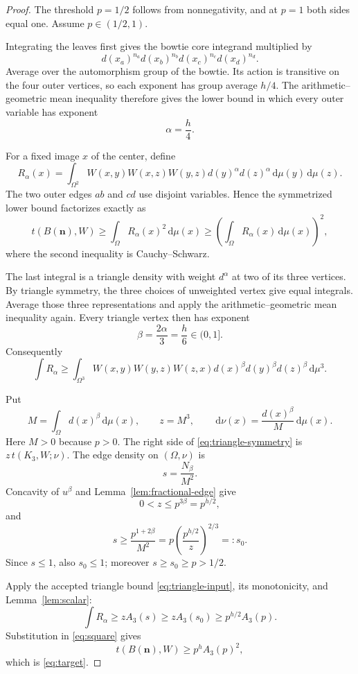 \documentclass[11pt]{article}
\newcommand{\dd}{\,\mathrm d}
\begin{document}
\begin{proof}
The threshold $p=1/2$ follows from nonnegativity, and at $p=1$ both sides
equal one.  Assume $p\in(1/2,1)$.

Integrating the leaves first gives the bowtie core integrand multiplied by
\[
 d(x_a)^{n_a}d(x_b)^{n_b}d(x_c)^{n_c}d(x_d)^{n_d}.
\]
Average over the automorphism group of the bowtie.  Its action is transitive
on the four outer vertices, so each exponent has group average $h/4$.
The arithmetic--geometric mean inequality therefore gives the lower bound
in which every outer variable has exponent
\[
 \alpha=\frac h4.
\]

For a fixed image $x$ of the center, define
\[
 R_\alpha(x)
 =\int_{\Omega^2}
 W(x,y)W(x,z)W(y,z)d(y)^\alpha d(z)^\alpha
 \dd\mu(y)\dd\mu(z).
\]
The two outer edges $ab$ and $cd$ use disjoint variables.  Hence the
symmetrized lower bound factorizes exactly as
\begin{equation}
 t(B(\boldsymbol n),W)
 \geq\int_\Omega R_\alpha(x)^2\dd\mu(x)
 \geq\left(\int_\Omega R_\alpha(x)\dd\mu(x)\right)^2,
 \label{eq:square}
\end{equation}
where the second inequality is Cauchy--Schwarz.

The last integral is a triangle density with weight $d^\alpha$ at two of
its three vertices.  By triangle symmetry, the three choices of unweighted
vertex give equal integrals.  Average those three representations and apply
the arithmetic--geometric mean inequality again.  Every triangle vertex then
has exponent
\[
 \beta=\frac{2\alpha}{3}=\frac h6\in(0,1].
\]
Consequently
\begin{equation}
 \int R_\alpha
 \geq\int_{\Omega^3}
 W(x,y)W(y,z)W(z,x)
 d(x)^\beta d(y)^\beta d(z)^\beta\dd\mu^3.
 \label{eq:triangle-symmetry}
\end{equation}

Put
\[
 M=\int_\Omega d(x)^\beta\dd\mu(x),
 \qquad z=M^3,
 \qquad
 \dd\nu(x)=\frac{d(x)^\beta}{M}\dd\mu(x).
\]
Here $M>0$ because $p>0$.  The right side of
\eqref{eq:triangle-symmetry} is $z\,t(K_3,W;\nu)$.  The edge density on
$(\Omega,\nu)$ is
\[
 s=\frac{N_\beta}{M^2}.
\]
Concavity of $u^\beta$ and Lemma~\ref{lem:fractional-edge} give
\[
 0<z\leq p^{3\beta}=p^{h/2},
\]
and
\[
 s\geq\frac{p^{1+2\beta}}{M^2}
 =p\left(\frac{p^{h/2}}z\right)^{2/3}
 =:s_0.
\]
Since $s\leq1$, also $s_0\leq1$; moreover $s\geq s_0\geq p>1/2$.

Apply the accepted triangle bound \eqref{eq:triangle-input}, its
monotonicity, and Lemma~\ref{lem:scalar}:
\[
 \int R_\alpha
 \geq zA_3(s)
 \geq zA_3(s_0)
 \geq p^{h/2}A_3(p).
\]
Substitution in \eqref{eq:square} gives
\[
 t(B(\boldsymbol n),W)
 \geq p^hA_3(p)^2,
\]
which is \eqref{eq:target}.
\end{proof}
\end{document}
